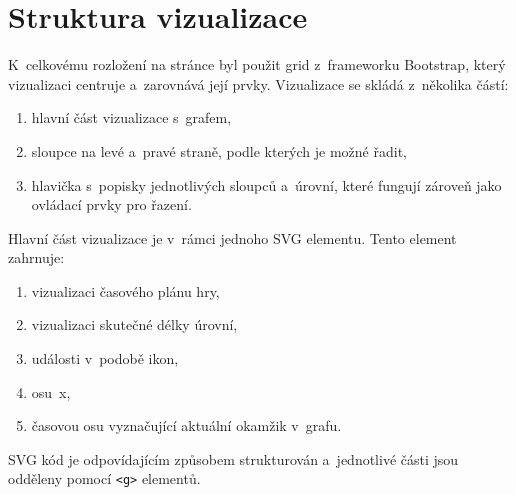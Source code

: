 \documentclass[
  digital, %
  oneside, %
  table,   %
  nolof,     %
  nolot,     %
]{fithesis3}
\begin{document}
\section{Struktura vizualizace} \label{chartStructure}
K~celkovému rozložení na stránce byl použit grid z~frameworku Bootstrap, který vizualizaci centruje a~zarovnává její prvky. Vizualizace se skládá z~několika částí:
\begin{enumerate}
  \item hlavní část vizualizace s~grafem,
  \item sloupce na levé a~pravé straně, podle kterých je možné řadit,
  \item hlavička s~popisky jednotlivých sloupců a~úrovní, které fungují zároveň jako ovládací prvky pro řazení.
\end{enumerate}
Hlavní část vizualizace je v~rámci jednoho SVG elementu. Tento element zahrnuje:
\begin{enumerate}
  \item vizualizaci časového plánu hry,
  \item vizualizaci skutečné délky úrovní,
  \item události v~podobě ikon,
  \item osu~x,
  \item časovou osu vyznačující aktuální okamžik v~grafu.
\end{enumerate}
SVG kód je odpovídajícím způsobem strukturován a~jednotlivé části jsou odděleny pomocí \verb|<g>| elementů.
\end{document}
